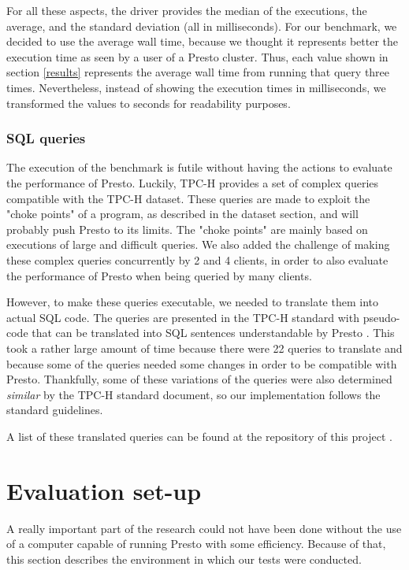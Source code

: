 \documentclass[conference]{IEEEtran}
\begin{document}
For all these aspects, the driver provides the median of the executions, the average, and the standard deviation (all in milliseconds). For our benchmark, we decided to use the average wall time, because we thought it represents better the execution time as seen by a user of a Presto cluster. Thus, each value shown in section \ref{results} represents the average wall time from running that query three times. Nevertheless, instead of showing the execution times in milliseconds, we transformed the values to seconds for readability purposes.

\subsubsection{SQL queries}
The execution of the benchmark is futile without having the actions to evaluate the performance of Presto. Luckily, TPC-H provides a set of complex queries compatible with the TPC-H dataset. These queries are made to exploit the "choke points" of a program, as described in the dataset section, and will probably push Presto to its limits. The "choke points" are mainly based on executions of large and difficult queries. We also added the challenge of making these complex queries concurrently by 2 and 4 clients, in order to also evaluate the performance of Presto when being queried by many clients.

However, to make these queries executable, we needed to translate them into actual SQL code. The queries are presented in the TPC-H standard with pseudo-code that can be translated into SQL sentences understandable by Presto \cite{transaction-processing-performance-council-2021}. This took a rather large amount of time because there were 22 queries to translate and because some of the queries needed some changes in order to be compatible with Presto. Thankfully, some of these variations of the queries were also determined \textit{similar} by the TPC-H standard document, so our implementation follows the standard guidelines.

A list of these translated queries can be found at the repository of this project \cite{perez-rodriguez-2021}.

\section{Evaluation set-up} \label{setup}
A really important part of the research could not have been done without the use of a computer capable of running Presto with some efficiency. Because of that, this section describes the environment in which our tests were conducted.
\end{document}
